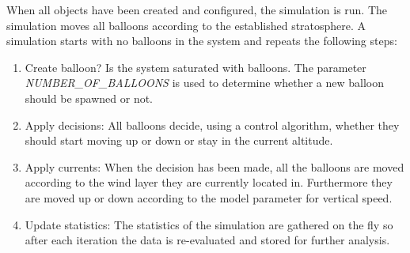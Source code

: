 When all objects have been created and configured, the simulation is run. 
The simulation moves all balloons according to the established stratosphere. A simulation starts with no balloons in the system and repeats the following steps:
\begin{enumerate}
    \item Create balloon? Is the system saturated with balloons. The parameter \textit{NUMBER\_OF\_BALLOONS} is used to determine whether a new balloon should be spawned or not.
    \item Apply decisions: All balloons decide, using a control algorithm, whether they should start moving up or down or stay in the current altitude. 
    \item Apply currents: When the decision has been made, all the balloons are moved according to the wind layer they are currently located in. Furthermore they are moved up or down according to the model parameter for vertical speed. 
    \item Update statistics: The statistics of the simulation are gathered on the fly so after each iteration the data is re-evaluated and stored for further analysis.
\end{enumerate}

